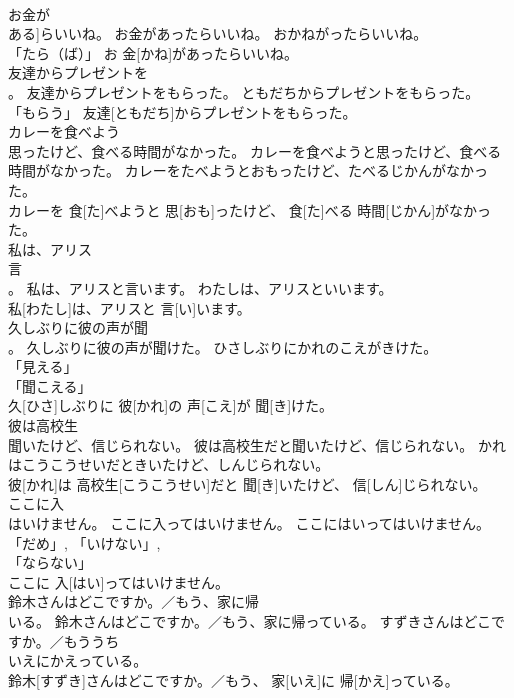 \documentclass[8pt]{extreport}
\begin{document}
\begin{CJK}{UTF8}{min}
\\	お金が
\\	ある]らいいね。	お金があったらいいね。	おかねがったらいいね。	
\\	「たら（ば）」	お 金[かね]があったらいいね。		
\\	友達からプレゼントを
\\	。	友達からプレゼントをもらった。	ともだちからプレゼントをもらった。	
\\	「もらう」	友達[ともだち]からプレゼントをもらった。		
\\	カレーを食べよう
\\	思ったけど、食べる時間がなかった。	カレーを食べようと思ったけど、食べる時間がなかった。	カレーをたべようとおもったけど、たべるじかんがなかった。	
\\	カレーを 食[た]べようと 思[おも]ったけど、 食[た]べる 時間[じかん]がなかった。		
\\	私は、アリス
\\	言
\\	。	私は、アリスと言います。	わたしは、アリスといいます。	
\\	私[わたし]は、アリスと 言[い]います。		
\\	久しぶりに彼の声が聞
\\	。	久しぶりに彼の声が聞けた。	ひさしぶりにかれのこえがきけた。	
\\	「見える」 
\\	「聞こえる」 
\\	久[ひさ]しぶりに 彼[かれ]の 声[こえ]が 聞[き]けた。		
\\	彼は高校生
\\	聞いたけど、信じられない。	彼は高校生だと聞いたけど、信じられない。	かれはこうこうせいだときいたけど、しんじられない。	
\\	彼[かれ]は 高校生[こうこうせい]だと 聞[き]いたけど、 信[しん]じられない。		
\\	ここに入
\\	はいけません。	ここに入ってはいけません。	ここにはいってはいけません。	
\\	「だめ」, 「いけない」, 
\\	「ならない」 
\\	ここに 入[はい]ってはいけません。		
\\	鈴木さんはどこですか。／もう、家に帰
\\	いる。	鈴木さんはどこですか。／もう、家に帰っている。	すずきさんはどこですか。／もう{うち
\\	いえ}にかえっている。	
\\	鈴木[すずき]さんはどこですか。／もう、 家[いえ]に 帰[かえ]っている。		

\end{CJK}
\end{document}
